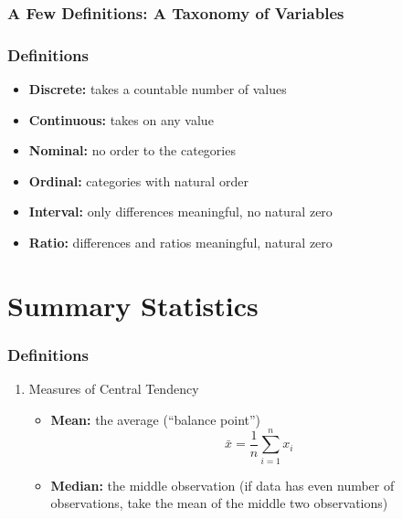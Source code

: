 \documentclass{beamer}
\begin{document}
\begin{frame}
\frametitle{A Few Definitions: A Taxonomy of Variables}
	\begin{figure}[htbp]
	\begin{center}
		\end{center}
	\end{figure}
\end{frame}

\begin{frame}
\frametitle{Definitions}
	\begin{itemize}
		\item \textbf{Discrete:} takes a countable number of values
		\item \textbf{Continuous:} takes on any value
		\item \textbf{Nominal:} no order to the categories
		\item \textbf{Ordinal:} categories with natural order
		\item \textbf{Interval:} only differences meaningful, no natural zero
		\item \textbf{Ratio:} differences and ratios meaningful, natural zero
	\end{itemize}
\end{frame}

\section{Summary Statistics}
\begin{frame}
\frametitle{Definitions}
	\begin{enumerate}
		\item Measures of Central Tendency
		\begin{itemize}
			\item \textbf{Mean:} the average (``balance point'')
			$$
			\bar{x} = \frac{1}{n} \sum_{i=1}^n x_i
			$$
			\item \textbf{Median:} the middle observation (if data has even number of 							observations, take the mean of the middle two observations)
		\end{itemize}
	\end{enumerate}
\end{frame}
\end{document}
